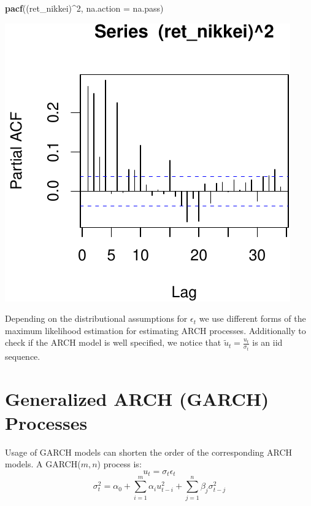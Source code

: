 \documentclass[11pt,]{article}
\newenvironment{Shaded}{\begin{snugshade}}{\end{snugshade}}
\newcommand{\KeywordTok}[1]{\textcolor[rgb]{0.13,0.29,0.53}{\textbf{#1}}}
\newcommand{\DataTypeTok}[1]{\textcolor[rgb]{0.13,0.29,0.53}{#1}}
\newcommand{\DecValTok}[1]{\textcolor[rgb]{0.00,0.00,0.81}{#1}}
\newcommand{\OperatorTok}[1]{\textcolor[rgb]{0.81,0.36,0.00}{\textbf{#1}}}
\newcommand{\NormalTok}[1]{#1}
\begin{document}
\begin{Shaded}
\begin{Highlighting}[]
\KeywordTok{pacf}\NormalTok{((ret_nikkei)}\OperatorTok{^}\DecValTok{2}\NormalTok{, }\DataTypeTok{na.action =}\NormalTok{ na.pass)}
\end{Highlighting}
\end{Shaded}

\begin{center}\includegraphics{FMC_T4_PhD_ARMA_GARCH_files/figure-latex/ARCH_order-3} \end{center}

Depending on the distributional assumptions for \(\epsilon_t\) we use
different forms of the maximum likelihood estimation for estimating ARCH
processes. Additionally to check if the ARCH model is well specified, we
notice that \(\tilde{u}_t = \frac{u_t}{\sigma_t}\) is an iid sequence.

\section{Generalized ARCH (GARCH)
Processes}\label{generalized-arch-garch-processes}

Usage of GARCH models can shorten the order of the corresponding ARCH
models. A GARCH(\(m,n\)) process is: \[u_t = \sigma_t \epsilon_t\]
\[\sigma_t^2 = \alpha_0 + \sum_{i=1}^m \alpha_iu_{t-i}^2 + \sum_{j=1}^n \beta_j\sigma_{t-j}^2\]
\end{document}
